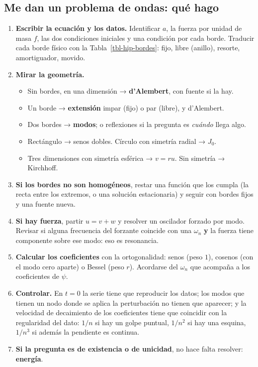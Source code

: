 \documentclass[
  spanish,
  a4paper,
]{scrbook}
\providecommand{\tightlist}{%
  \setlength{\itemsep}{0pt}\setlength{\parskip}{0pt}}
\theoremstyle{definition}
\theoremstyle{plain}
\theoremstyle{definition}
\theoremstyle{plain}
\theoremstyle{definition}
\theoremstyle{remark}
\begin{document}
\subsection{Me dan un problema de ondas: qué
hago}\label{sec-hip-resumen-12}

\begin{enumerate}
\def\labelenumi{\arabic{enumi}.}
\tightlist
\item
  \textbf{Escribir la ecuación y los datos.} Identificar \(a\), la
  fuerza por unidad de masa \(f\), las dos condiciones iniciales y una
  condición por cada borde. Traducir cada borde físico con la
  Tabla~\ref{tbl-hip-bordes}: fijo, libre (anillo), resorte,
  amortiguador, movido.
\item
  \textbf{Mirar la geometría.}

  \begin{itemize}
  \tightlist
  \item
    Sin bordes, en una dimensión → \textbf{d'Alembert}, con fuente si la
    hay.
  \item
    Un borde → \textbf{extensión} impar (fijo) o par (libre), y
    d'Alembert.
  \item
    Dos bordes → \textbf{modos}; o reflexiones si la pregunta es
    \emph{cuándo} llega algo.
  \item
    Rectángulo → senos dobles. Círculo con simetría radial → \(J_0\).
  \item
    Tres dimensiones con simetría esférica → \(v = ru\). Sin simetría →
    Kirchhoff.
  \end{itemize}
\item
  \textbf{Si los bordes no son homogéneos}, restar una función que los
  cumpla (la recta entre los extremos, o una solución estacionaria) y
  seguir con bordes fijos y una fuente nueva.
\item
  \textbf{Si hay fuerza}, partir \(u = v + w\) y resolver un oscilador
  forzado por modo. Revisar si alguna frecuencia del forzante coincide
  con una \(\omega_n\) \textbf{y} la fuerza tiene componente sobre ese
  modo: eso es resonancia.
\item
  \textbf{Calcular los coeficientes} con la ortogonalidad: senos (peso
  \(1\)), cosenos (con el modo cero aparte) o Bessel (peso \(r\)).
  Acordarse del \(\omega_n\) que acompaña a los coeficientes de
  \(\psi\).
\item
  \textbf{Controlar.} En \(t=0\) la serie tiene que reproducir los
  datos; los modos que tienen un nodo donde se aplica la perturbación no
  tienen que aparecer; y la velocidad de decaimiento de los coeficientes
  tiene que coincidir con la regularidad del dato: \(1/n\) si hay un
  golpe puntual, \(1/n^2\) si hay una esquina, \(1/n^3\) si además la
  pendiente es continua.
\item
  \textbf{Si la pregunta es de existencia o de unicidad}, no hace falta
  resolver: \textbf{energía}.
\end{enumerate}
\end{document}
